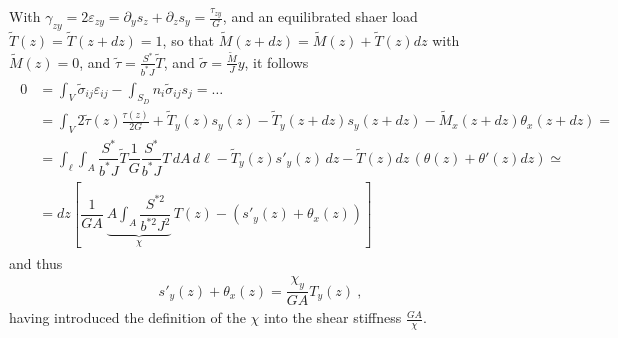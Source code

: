 \documentclass[letterpaper,10pt,english]{jupyterBook}
\begin{document}
\sphinxAtStartPar
{} With \(\gamma_{zy} = 2 \varepsilon_{zy} = \partial_y s_z + \partial_z s_y = \frac{\tau_{zy}}{G}\), and an equilibrated shaer load \(\widetilde{T}(z) = \widetilde{T}(z+dz) = 1\), so that \(\widetilde{M}(z+dz) = \widetilde{M}(z) + \widetilde{T}(z) d z\) with \(\widetilde{M}(z) = 0\), and \(\widetilde{\tau} = \frac{S^*}{b^* J} \widetilde{T}\), and \(\widetilde{\sigma} = \frac{\widetilde{M}}{J} y\), it follows
\begin{equation*}
\begin{split}\begin{aligned}
  0 & = \int_V \widetilde{\sigma}_{ij} \varepsilon_{ij} - \int_{S_D} n_i \widetilde{\sigma}_{ij} s_j = \dots \\
    & = \int_V 2 \widetilde{\tau}(z) \frac{\tau(z)}{2 G} + \widetilde{T}_y(z) s_y(z) - \widetilde{T}_y(z+dz) s_y(z+dz) - \widetilde{M}_x(z+dz) \theta_x (z + d z) = \\
    & = \int_{\ell} \int_A \dfrac{S^*}{b^* J} \widetilde{T} \dfrac{1}{G} \dfrac{S^*}{b^* J} T \, dA \, d\ell - \widetilde{T}_y(z) s'_y(z) \, dz - \widetilde{T}(z) dz \, \left( \theta(z) + \theta'(z) d z \right) \simeq \\
    & = dz \left[ \dfrac{1}{GA} \ \underbrace{A \int_{A} \dfrac{S^{* 2}}{b^{* 2} J^2}}_{ \chi } \, T(z) - \left( s'_y(z) + \theta_x(z) \right) \right]
\end{aligned}\end{split}
\end{equation*}
\sphinxAtStartPar
and thus
\begin{equation*}
\begin{split}s'_y(z) + \theta_x(z) = \dfrac{\chi_y}{GA} T_y(z) \ ,\end{split}
\end{equation*}
\sphinxAtStartPar
having introduced the definition of the  \(\chi\) into the shear stiffness \(\frac{GA}{\chi}\).
\label{ch/solids/beams/de-saint-venant:example-0}
\end{document}
